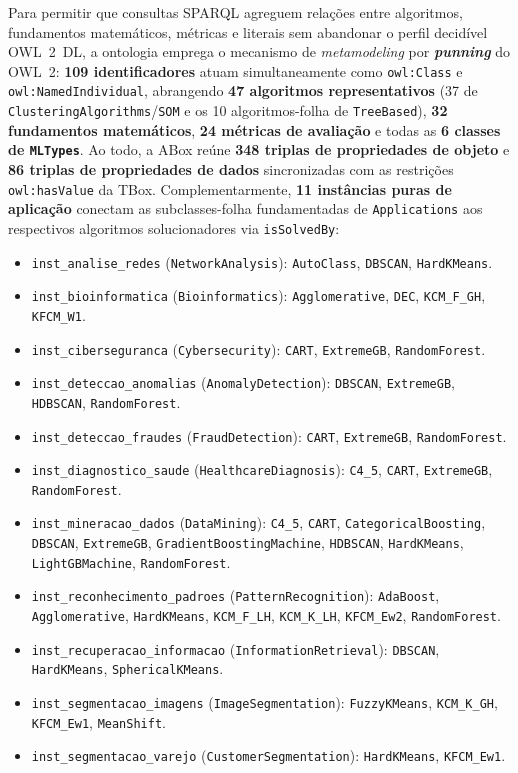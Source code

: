 \documentclass[11pt,a4paper]{article}
\newcommand{\onto}[1]{\texttt{#1}}
\begin{document}
Para permitir que consultas SPARQL agreguem relações entre algoritmos, fundamentos matemáticos, métricas e literais sem abandonar o perfil decidível OWL~2~DL, a ontologia emprega o mecanismo de \emph{metamodeling} por \textbf{\emph{punning}} do OWL~2: \textbf{109 identificadores} atuam simultaneamente como \onto{owl:Class} e \onto{owl:NamedIndividual}, abrangendo \textbf{47 algoritmos representativos} (37 de \onto{ClusteringAlgorithms}/\onto{SOM} e os 10 algoritmos-folha de \onto{TreeBased}), \textbf{32 fundamentos matemáticos}, \textbf{24 métricas de avaliação} e todas as \textbf{6 classes de \onto{MLTypes}}. Ao todo, a ABox reúne \textbf{348 triplas de propriedades de objeto} e \textbf{86 triplas de propriedades de dados} sincronizadas com as restrições \onto{owl:hasValue} da TBox. Complementarmente, \textbf{11 instâncias puras de aplicação} conectam as subclasses-folha fundamentadas de \onto{Applications} aos respectivos algoritmos solucionadores via \onto{isSolvedBy}:
\begin{itemize}[leftmargin=*,nosep]
  \item \onto{inst\_analise\_redes} (\onto{NetworkAnalysis}): \onto{AutoClass}, \onto{DBSCAN}, \onto{HardKMeans}.
  \item \onto{inst\_bioinformatica} (\onto{Bioinformatics}): \onto{Agglomerative}, \onto{DEC}, \onto{KCM\_F\_GH}, \onto{KFCM\_W1}.
  \item \onto{inst\_ciberseguranca} (\onto{Cybersecurity}): \onto{CART}, \onto{ExtremeGB}, \onto{RandomForest}.
  \item \onto{inst\_deteccao\_anomalias} (\onto{AnomalyDetection}): \onto{DBSCAN}, \onto{ExtremeGB}, \onto{HDBSCAN}, \onto{RandomForest}.
  \item \onto{inst\_deteccao\_fraudes} (\onto{FraudDetection}): \onto{CART}, \onto{ExtremeGB}, \onto{RandomForest}.
  \item \onto{inst\_diagnostico\_saude} (\onto{HealthcareDiagnosis}): \onto{C4\_5}, \onto{CART}, \onto{ExtremeGB}, \onto{RandomForest}.
  \item \onto{inst\_mineracao\_dados} (\onto{DataMining}): \onto{C4\_5}, \onto{CART}, \onto{CategoricalBoosting}, \onto{DBSCAN}, \onto{ExtremeGB}, \onto{GradientBoostingMachine}, \onto{HDBSCAN}, \onto{HardKMeans}, \onto{LightGBMachine}, \onto{RandomForest}.
  \item \onto{inst\_reconhecimento\_padroes} (\onto{PatternRecognition}): \onto{AdaBoost}, \onto{Agglomerative}, \onto{HardKMeans}, \onto{KCM\_F\_LH}, \onto{KCM\_K\_LH}, \onto{KFCM\_Ew2}, \onto{RandomForest}.
  \item \onto{inst\_recuperacao\_informacao} (\onto{InformationRetrieval}): \onto{DBSCAN}, \onto{HardKMeans}, \onto{SphericalKMeans}.
  \item \onto{inst\_segmentacao\_imagens} (\onto{ImageSegmentation}): \onto{FuzzyKMeans}, \onto{KCM\_K\_GH}, \onto{KFCM\_Ew1}, \onto{MeanShift}.
  \item \onto{inst\_segmentacao\_varejo} (\onto{CustomerSegmentation}): \onto{HardKMeans}, \onto{KFCM\_Ew1}.
\end{itemize}
\end{document}
